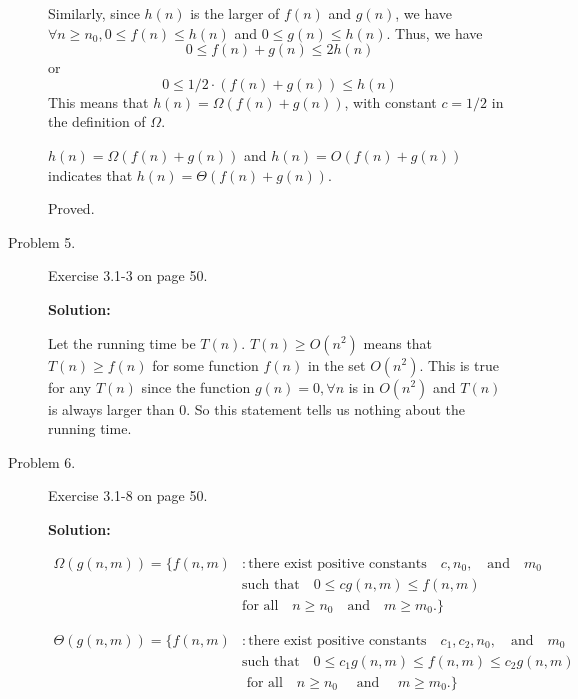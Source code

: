 \documentclass[11pt]{article}
\begin{document}
\begin{description}
Similarly, since $h(n)$ is the larger of $f(n)$ and $g(n)$, we
have $\forall n\ge n_0, 0\le f(n)\le h(n)$ and $0 \le g(n) \le
h(n)$. Thus, we have
$$
0\le f(n) + g(n) \le 2h(n)
$$
or
$$
0\le 1/2 \cdot(f(n) + g(n)) \le h(n)
$$
This means that $h(n)=\Omega(f(n)+g(n))$, with constant $c=1/2$ in
the definition of $\Omega$.

$h(n)=\Omega(f(n)+g(n))$ and $h(n)=O(f(n)+g(n))$ indicates that
$h(n)=\Theta(f(n)+g(n))$.

Proved.


\item[Problem 5.] Exercise 3.1-3  on page 50.

\noindent \textbf{Solution:}

Let the running time be $T(n)$. $T(n)\ge O(n^2)$ means that
$T(n)\ge f(n)$ for some function $f(n)$ in the set $O(n^2)$. This
is true for any $T(n)$ since the function $g(n)=0, \forall n$ is
in $O(n^2)$ and $T(n)$ is always larger than 0. So this statement
tells us nothing about the running time.

\item[Problem 6.]Exercise 3.1-8  on page 50.

\noindent \textbf{Solution:}

\begin{eqnarray}
\Omega(g(n,m))=\{ f(n,m) &: \mbox{there exist positive
constants}\quad c, n_0, \quad \mbox{and} \quad m_0 \nonumber \\
&\mbox{such that}\quad 0\le cg(n,m) \le f(n,m) \quad \nonumber \\
&\mbox{for all} \quad n\ge n_0 \quad \mbox{and}\quad m\ge
m_0.\}\nonumber
\end{eqnarray}

\begin{eqnarray}
\Theta(g(n,m))=\{ f(n,m) &: \mbox{there exist positive
constants}\quad c_1, c_2, n_0, \quad \mbox{and} \quad m_0 \nonumber \\
&\mbox{such that}\quad 0\le c_1 g(n,m)\le f(n,m) \le c_2 g(n,m) \nonumber \\
&\mbox{ for all} \quad n\ge n_0 \quad\mbox{ and }\quad m\ge m_0.\}
\nonumber
\end{eqnarray}



\end{description}
\end{document}
